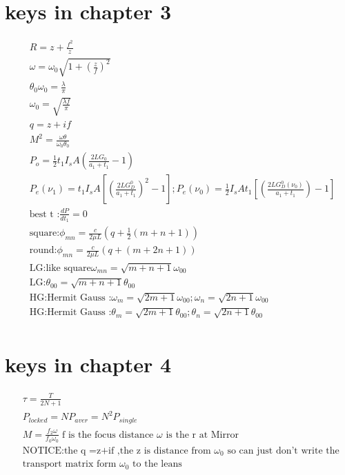 \documentclass{article}
\begin{document}
\section{keys in chapter 3}
\begin{align*}
 &R=z+\frac{f^2}{z}\\
 &\omega=\omega_0\sqrt{1+(\frac zf)^2}\\
 &\theta_0\omega_0=\frac\lambda \pi\\
 &\omega_0=\sqrt{\frac{\lambda f}{\pi}}\\
 &q=z+if\\
 &M^2=\frac{\omega\theta}{\omega_0\theta_0}\\
 &P_{o}=\frac12t_1I_sA(\frac{2LG_0}{a_1+t_1}-1)\\
 &P_{e}(\nu_1)=t_1I_sA[(\frac{2LG_D^0}{a_1+t_1})^2-1];P_{e}(\nu_0)=\frac12I_sAt_1[(\frac{2LG_D^0(\nu_0)}{a_1+t_1})-1]\\
 &\text{best t :}\frac{dP}{dt_1}=0\\
 &\text{square:}\phi_{mn}=\frac{c}{2\mu L}(q+\frac12(m+n+1))\\
 &\text{round:}\phi_{mn}=\frac{c}{2\mu L}(q+(m+2n+1))\\
 &\text{LG:like square}\omega_{mn}=\sqrt{m+n+1}\omega_{00}\\
 &\text{LG:}\theta_{00}=\sqrt{m+n+1}\theta_{00}\\
 &\text{HG:Hermit Gauss :}\omega_m=\sqrt{2m+1}\omega_{00};\omega_n=\sqrt{2n+1}\omega_{00} \\
 &\text{HG:Hermit Gauss :}\theta_m=\sqrt{2m+1}\theta_{00};\theta_n=\sqrt{2n+1}\theta_{00}\\
\end{align*}
\newpage
\section{keys in chapter 4}
\begin{align*}
  &\tau=\frac{T}{2N+1}\\
  &P_{locked}=NP_{aver}=N^2P_{single}\\
  &M=\frac{f_2\omega}{f_0\omega_0}\;\text{f is the focus distance $\omega$ is the r at Mirror}\\
  &\text{NOTICE:the q =z+if ,the z is distance from $\omega_0$ so can just don't write the }\\&\text{transport matrix form $\omega_0$ to the leans }
\end{align*}
\end{document}
